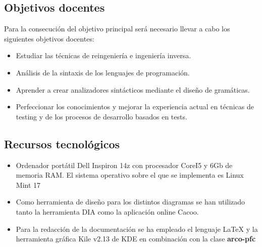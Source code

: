 \subsection{Objetivos docentes} \label{sec:objetivos-docentes}

Para la consecución del objetivo principal será necesario llevar a cabo los siguientes objetivos docentes:
\begin{itemize}
\item Estudiar las técnicas de reingeniería e ingeniería inversa.
\item Análisis de la sintaxis de los lenguajes de programación.
\item Aprender a crear analizadores sintácticos mediante el diseño de gramáticas.
\item Perfeccionar los conocimientos y mejorar la experiencia actual en técnicas de testing y de los procesos de desarrollo basados en tests.	
\end{itemize}

\subsection{Recursos tecnológicos} \label{sec:recursos-tecnológicos}

\begin{itemize}
 \item Ordenador portátil Dell Inspiron 14z con procesador CoreI5 y 6Gb de memoria RAM. El sistema operativo sobre el que se implementa es
 Linux Mint 17
 \item Como herramienta de diseño para los distintos diagramas se han utilizado tanto la herramienta DIA como la aplicación online Cacoo.
 \item Para la redacción de la documentación se ha empleado el lenguaje \LaTeX{} y la herramienta gráfica Kile v2.13 de KDE en combinación 
 con la clase \textbf{arco-pfc}
 
\end{itemize}

